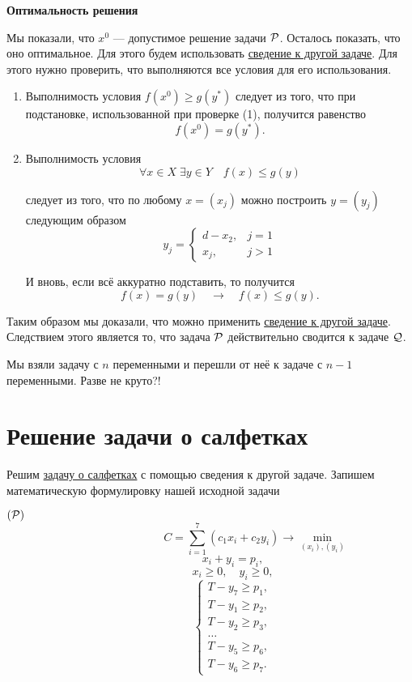 \bigskip

\textbf{Оптимальность решения}

Мы показали, что $x^0$ --- допустимое решение задачи $\P$. Осталось показать, что оно оптимальное. Для этого будем использовать \hyperref[fact:reduction_to_other_problem]{сведение к другой задаче}. Для этого нужно проверить, что выполняются все условия для его использования.

\begin{enumerate}[nosep]
	\item Выполнимость условия $f(x^0) \ge g(y^*)$ следует из того, что при подстановке, использованной при проверке (1), получится равенство
	\[
	f(x^0) = g(y^*).
	\]
	
	\item Выполнимость условия
	\[
	\forall x \in X \; \exists y \in Y \quad f(x) \le g(y)
	\]
	
	следует из того, что по любому $x = (x_j)$ можно построить $y = (y_j)$ следующим образом
	\[
	y_j = \begin{cases}
		d - x_2,& j = 1 \\
		x_j,& j > 1
	\end{cases}
	\]
	
	И вновь, если всё аккуратно подставить, то получится
	\[
	f(x) = g(y) \quad \rightarrow \quad f(x) \le g(y).
	\]
\end{enumerate}

Таким образом мы доказали, что можно применить \hyperref[fact:reduction_to_other_problem]{сведение к другой задаче}. Следствием этого является то, что задача $\P$ действительно сводится к задаче $\Q$.

Мы взяли задачу с $n$ переменными и перешли от неё к задаче с $n-1$ переменными. Разве не круто?!

\section{Решение задачи о салфетках}


Решим \hyperref[pr:napkins]{задачу о салфетках} с помощью сведения к другой задаче. Запишем математическую формулировку нашей исходной задачи

$(\P) $
\[
\qquad\qquad\qquad\qquad C = \sum_{i=1}^7 (c_1 x_i + c_2 y_i) \to \min_{(x_i), (y_i)}
\]
\[
\qquad\qquad x_i + y_i = p_i,
\]
\[
\qquad\qquad x_i \ge 0, \quad y_i \ge 0,
\]
\[
\qquad\qquad\begin{cases}
	T - y_7 \ge p_1, \\
	T - y_1 \ge p_2, \\
	T - y_2 \ge p_3, \\
	\dots \\
	T - y_5 \ge p_6, \\
	T - y_6 \ge p_7.
\end{cases}
\]

